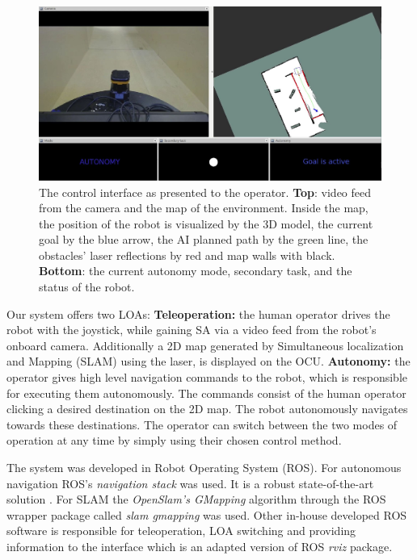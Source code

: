 \documentclass[a4paper,12pt,oneside,openright]{bhamthesis}
\begin{document}
\begin{figure}
	\centering
	\includegraphics[width=1\columnwidth]{chapter3_fig/interface_pilot.jpeg}
	\caption{The control interface as presented to the operator. \textbf{Top}: video feed from the camera and the map of the environment. Inside the map, the position of the robot is visualized by the 3D model, the current goal by the blue arrow, the AI planned path by the green line, the obstacles' laser reflections by red and map walls with black. \textbf{Bottom}: the current autonomy mode, secondary task, and the status of the robot. }
	\label{fig:interface_pilot}
\end{figure}

Our system offers two LOAs: \textbf{Teleoperation:} the human operator drives the robot with the joystick, while gaining SA via a video feed from the robot's onboard camera. Additionally a 2D map generated by Simultaneous localization and Mapping (SLAM) using the laser, is displayed on the OCU. \textbf{Autonomy:} the operator gives high level navigation commands to the robot, which is responsible for executing them autonomously. The commands consist of the human operator clicking a desired destination on the 2D map. The robot autonomously navigates towards these destinations. The operator can switch between the two modes of operation at any time by simply using their chosen control method.

The system was developed in Robot Operating System (ROS). For autonomous navigation ROS's \textit{navigation stack} was used. It is a robust state-of-the-art solution \citep{Marder-Eppstein2010}. For SLAM the \textit{OpenSlam's GMapping} algorithm \citep{gmapping} through the ROS wrapper package called \textit{slam gmapping} was used. Other in-house developed ROS software is responsible for teleoperation, LOA switching and providing information to the interface which is an adapted version of ROS  \textit{rviz} package.
\end{document}
